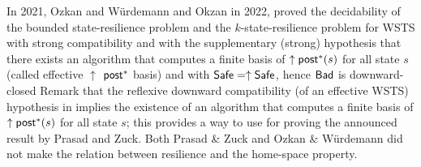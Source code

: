 In 2021, Ozkan and Würdemann  \cite{DBLP:journals/corr/abs-2108-00889} and Okzan in 2022, \cite{DBLP:conf/gg/Ozkan22} proved the decidability of the bounded state-resilience problem and the $k$-state-resilience problem for WSTS  with strong compatibility and with the supplementary (strong) hypothesis that there exists an algorithm that computes a finite basis of $\uparrow \textsf{post}^*(s)$ for all state $s$ (called effective 
$\uparrow$ $\textsf{post}^*$ basis) and with $\textsf{Safe}=\uparrow \textsf{Safe}$, hence $\textsf{Bad}$ is downward-closed
Remark that the reflexive downward compatibility (of an effective WSTS) hypothesis in  \cite{DBLP:journals/corr/PrasadZ16} implies the existence of an algorithm that computes a finite basis of $\uparrow \textsf{post}^*(s)$ for all state $s$; this provides a way to use \cite{DBLP:journals/corr/abs-2108-00889} for proving the announced result by Prasad and Zuck.
Both Prasad \& Zuck and Ozkan \& Würdemann did not make the relation between resilience and the home-space property.
%






